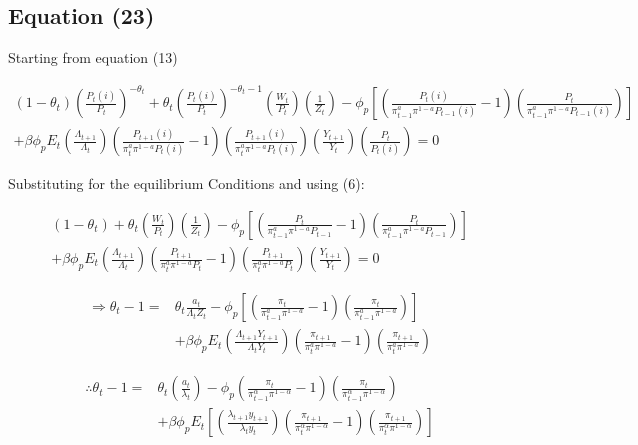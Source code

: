 \documentclass[11pt,preprint, authoryear]{elsarticle}
\numberwithin{equation}{section}
\numberwithin{figure}{section}
\numberwithin{table}{section}
\begin{document}
\hypertarget{equation-23}{%
\subsection{Equation (23)}\label{equation-23}}

Starting from equation (13)

\[\begin{array}{l} (1-\theta_t)(\frac{P_t(i)}{P_t})^{-\theta_t} + \theta_t(\frac{P_t(i)}{P_t})^{-\theta_t-1}(\frac{W_t}{P_t})(\frac{1}{Z_t}) - \phi_p[(\frac{P_t(i)}{\pi_{t-1}^a \pi^{1-a}P_{t-1}(i)}-1)(\frac{P_t}{\pi_{t-1}^a \pi^{1-a}P_{t-1}(i)})] \\
+\beta\phi_pE_t(\frac{\Lambda_{t+1}}{\Lambda_{t}})(\frac{P_{t+1}(i)}{\pi_t^a\pi^{1-a}P_{t}(i)}-1)(\frac{P_{t+1}(i)}{\pi_t^a\pi^{1-a}P_{t}(i)})(\frac{Y_{t+1}}{Y_t})(\frac{P_t}{P_t(i)})=0 \end{array}\]

Substituting for the equilibrium Conditions and using (6):

\[\begin{aligned} (1-\theta_t) + \theta_t (\frac{W_t}{P_t})(\frac{1}{Z_t}) - \phi_p[(\frac{P_t}{\pi_{t-1}^a \pi^{1-a}P_{t-1}}-1)(\frac{P_t}{\pi_{t-1}^a \pi^{1-a}P_{t-1}})] \\
+\beta\phi_pE_t(\frac{\Lambda_{t+1}}{\Lambda_{t}})(\frac{P_{t+1}}{\pi_t^a\pi^{1-a}P_{t}}-1)(\frac{P_{t+1}}{\pi_t^a\pi^{1-a}P_{t}})(\frac{Y_{t+1}}{Y_t})=0 \end{aligned}\]

\[\begin{aligned} \Rightarrow \theta_t - 1 = & \theta_t \frac{a_t}{\Lambda_t Z_t} - \phi_p[(\frac{\pi_t}{\pi_{t-1}^a \pi^{1-a}}-1)(\frac{\pi_t}{\pi_{t-1}^a \pi^{1-a}})] \\
& +\beta\phi_pE_t(\frac{\Lambda_{t+1}Y_{t+1}}{\Lambda_{t}Y_t})(\frac{\pi_{t+1}}{\pi_t^a\pi^{1-a}}-1)(\frac{\pi_{t+1}}{\pi_t^a\pi^{1-a}}) \end{aligned}\]

\[\begin{aligned} \therefore \theta_{t}-1=& \theta_{t}\left(\frac{a_{t}}{\lambda_{t}}\right)-\phi_{p}\left(\frac{\pi_{t}}{\pi_{t-1}^{\alpha} \pi^{1-\alpha}}-1\right)\left(\frac{\pi_{t}}{\pi_{t-1}^{\alpha} \pi^{1-\alpha}}\right) \\
&+\beta \phi_{p} E_{t}\left[\left(\frac{\lambda_{t+1} y_{t+1}}{\lambda_{t} y_{t}}\right)\left(\frac{\pi_{t+1}}{\pi_{t}^{\alpha} \pi^{1-\alpha}}-1\right)\left(\frac{\pi_{t+1}}{\pi_{t}^{\alpha} \pi^{1-\alpha}}\right)\right]
\end{aligned}\]
\end{document}
